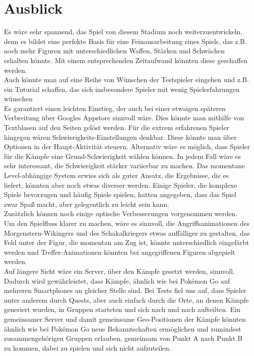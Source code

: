 \documentclass[extern,palatino]{cgBA}
\begin{document}
\section{Ausblick}
Es wäre sehr spannend, das Spiel von diesem Stadium noch weiterzuentwickeln, denn es bildet eine perfekte Basis für eine Feinausarbeitung eines Spiels, das z.B. noch mehr Figuren mit unterschiedlichen Waffen, Stärken und Schwächen erhalten könnte. Mit einem entsprechenden Zeitaufwand könnten diese geschaffen werden.
\\Auch könnte man auf eine Reihe von Wünschen der Testspieler eingehen und z.B. ein Tuturial schaffen, das sich insbesondere Spieler mit wenig Spielerfahrungen wünschen
\\Es garantiert einen leichten Einstieg, der auch bei einer etwaigen späteren Verbreitung über Googles Appstore sinnvoll wäre. Dies könnte man mithilfe von Textblasen auf den Seiten gelöst werden. Für die extrem erfahrenen Spieler hingegen wären Schwierigkeits-Einstellungen denkbar. Diese könnte man über Optionen in der Haupt-Aktivität steuern. Alternativ wäre es möglich, dass Spieler für die Kämpfe eine Grund-Schwierigkeit wählen können. In jedem Fall wäre es sehr interessant, die Schwierigkeit stärker variierbar zu machen. Das momentane Level-abhängige System erwies sich als guter Ansatz, die Ergebnisse, die es liefert, könnten aber noch etwas diverser werden. Einige Spieler, die komplexe Spiele bevorzugen und häufig Spiele spielen, hatten angegeben, dass das Spiel zwar Spaß macht, aber gelegentlich zu leicht sein kann.
\\Zusätzlich können noch einige optische Verbesserungen vorgenommen werden. Um den Spielfluss klarer zu machen, wäre es sinnvoll, die Angriffsanimationen des Morgenstern-Wikingers und des Schakalkriegers etwas auffälliger zu gestalten, das Feld unter der Figur, die momentan am Zug ist, könnte unterschiedlich eingefärbt werden und Treffer-Animationen könnten bei angegriffenen Figuren abgepielt werden. 
\\Auf längere Sicht wäre ein Server, über den Kämpfe gesetzt werden, sinnvoll. Dadurch wird gewährleistet, dass Kämpfe, ähnlich wie bei Pokémon Go auf mehreren Smartphones an gleicher Stelle sind. Bei Tests fiel uns auf, dass Spieler unter anderem durch Quests, aber auch einfach durch die Orte, an denen Kämpfe generiert wurden, in Gruppen starteten und sich nach und nach aufteilten. Ein gemeinsamer Server und damit gemeinsame Geo-Positionen der Kämpfe könnten ähnlich wie bei Pokémon Go neue Bekanntschaften ermöglichen und zumindest zusammengehörigen Gruppen erlauben, gemeinsam von Punkt A nach Punkt B zu kommen, dabei zu spielen und sich nicht aufzuteilen. 
\end{document}
